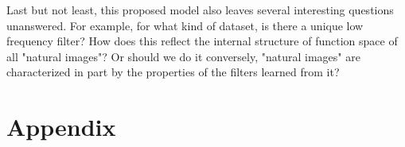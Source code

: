 \documentclass[a4paper]{article}
\begin{document}
Last but not least, this proposed model also leaves several interesting questions unanswered. For example, for what kind of dataset, is there a unique low frequency filter? How does this reflect the internal structure of function space of all "natural images"? Or should we do it conversely, "natural images" are characterized in part by the properties of the filters learned from it?

\section{Appendix}
\end{document}
